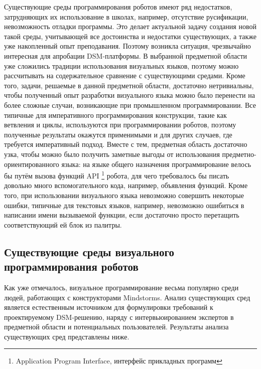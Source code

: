 Существующие среды программирования роботов имеют ряд недостатков, затрудняющих их 
использование в школах, например, отсутствие русификации, невозможность отладки программы. 
Это делает актуальной задачу создания новой такой среды, учитывающей все достоинства и 
недостатки существующих, а также уже накопленный опыт преподавания. Поэтому возникла 
ситуация, чрезвычайно интересная для апробации \ac{DSM}-платформы. В выбранной предметной 
области уже сложились традиции использования визуальных языков, поэтому можно рассчитывать 
на содержательное сравнение с существующими средами. Кроме того, задачи, решаемые в 
данной предметной области, достаточно нетривиальны, чтобы полученный опыт разработки 
визуального языка можно было перенести на более сложные случаи, возникающие при промышленном 
программировании. Все типичные для императивного программирования конструкции, такие 
как ветвления и циклы, используются при программировании роботов, поэтому полученные 
результаты окажутся применимыми и для других случаев, где требуется императивный подход. 
Вместе с тем, предметная область достаточно узка, чтобы можно было получить заметные 
выгоды от использования предметно-ориентированного языка: на языке общего назначения программирование велось бы путём вызова функций API%
\footnote{Application Program Interface, интерфейс прикладных программ}
 робота, для чего требовалось бы писать довольно много вспомогательного кода, например, объявления функций. Кроме того,
 при использовании визуального языка невозможно совершить некоторые ошибки, типичные 
для текстовых языков, например, невозможно ошибиться в написании имени вызываемой 
функции, если достаточно просто перетащить соответствующий ей блок из палитры.

\subsection{Существующие среды визуального программирования роботов}
Как уже отмечалось, визуальное программирование весьма популярно среди людей, работающих 
с конструкторами Mindstorms. Анализ существующих сред является естественным источником 
для формулировки требований к проектируемому \ac{DSM}-решению, наряду с интервьюированием 
экспертов в предметной области и потенциальных пользователей. Результаты анализа 
существующих сред представлены ниже.

